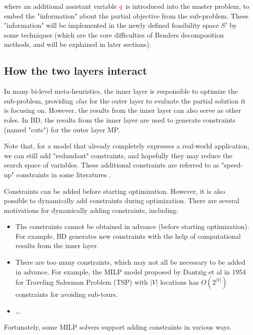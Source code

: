 \documentclass[twocolumn]{ctexart}
\begin{document}
where an additional assistant variable ${\color{red} q}$ is introduced into the master problem,
to embed the "information" about the partial objective from the sub-problem.
These "information" will be implemented in the newly defined feasibility space $S'$
by some techniques (which are the core difficulties of Benders decomposition methods, and will be explained in later sections).




\subsection{How the two layers interact}


In many bi-level meta-heuristics,
the inner layer is responsible to optimize the sub-problem,
providing \textit{clue} for the outer layer to evaluate the partial solution it is focusing on.
However, the results from the inner layer can also serve as other roles.
In BD, the results from the inner layer are used to generate constraints (named "cuts") for the outer layer MP.



Note that,
for a model that already completely expresses a real-world application,
we can still add "redundant" constraints,
and hopefully they may reduce the search space of variables.
These additional constraints are referred to as "speed-up" constraints in some literatures \cite{0148_0227_202012}.



Constraints can be added before starting optimization.
However, it is also possible to dynamically add constraints during optimization.  %
There are several motivations for dynamically adding constraints, including:
\begin{itemize}
    \item  The constraints cannot be obtained in advance (before starting optimization).
        For example, BD generates new constraints with the help of computational results from the inner layer.
    \item  There are too many constraints, which may not all be necessary to be added in advance.
        For example, the MILP model proposed by Dantzig et al in 1954 \cite{milp_tsp_1954_DFJ}
        for Traveling Salesman Problem (TSP) with $|V|$ locations has $O(2^{|V|})$ constraints for avoiding sub-tours.
    \item  \dots
\end{itemize}
Fortunately, some MILP solvers support adding constraints in various ways.
\end{document}
